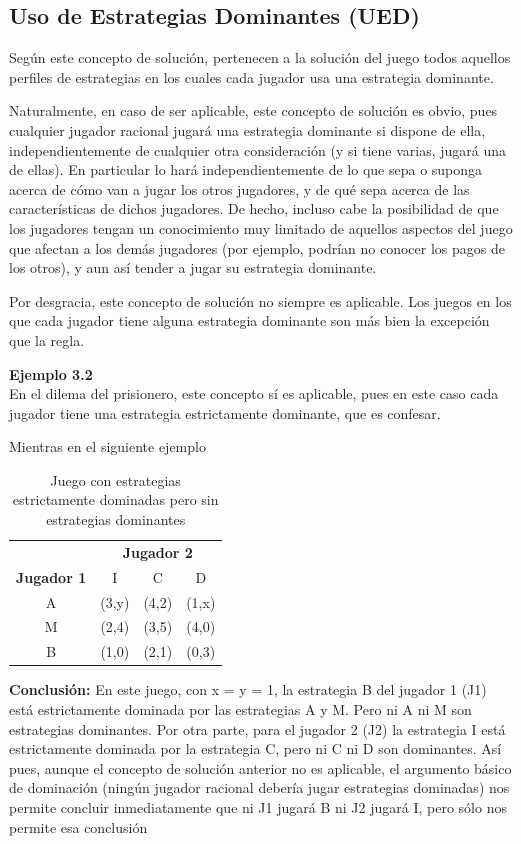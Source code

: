 \documentclass[12pt,a4paper,]{book}
\numberwithin{dummy}{section}
\theoremstyle{ocrenumbox}
\theoremstyle{blacknumex}
\theoremstyle{blacknumbox}
\theoremstyle{ocrenum}
\theoremstyle{ocrenum}
\begin{document}
\subsection{Uso de Estrategias Dominantes
(UED)}\label{uso-de-estrategias-dominantes-ued}

Según este concepto de solución, pertenecen a la solución del juego
todos aquellos perfiles de estrategias en los cuales cada jugador usa
una estrategia dominante.

Naturalmente, en caso de ser aplicable, este concepto de solución es
obvio, pues cualquier jugador racional jugará una estrategia dominante
si dispone de ella, independientemente de cualquier otra consideración
(y si tiene varias, jugará una de ellas). En particular lo hará
independientemente de lo que sepa o suponga acerca de cómo van a jugar
los otros jugadores, y de qué sepa acerca de las características de
dichos jugadores. De hecho, incluso cabe la posibilidad de que los
jugadores tengan un conocimiento muy limitado de aquellos aspectos del
juego que afectan a los demás jugadores (por ejemplo, podrían no conocer
los pagos de los otros), y aun así tender a jugar su estrategia
dominante.

Por desgracia, este concepto de solución no siempre es aplicable. Los
juegos en los que cada jugador tiene alguna estrategia dominante son más
bien la excepción que la regla.

\begin{tcolorbox}[colback=blue!10]
\textbf{Ejemplo 3.2} \\

En el dilema del prisionero, este concepto sí es aplicable, pues en este caso cada jugador tiene una estrategia estrictamente dominante, que es confesar.

Mientras en el siguiente ejemplo  

\begin{table}[H]
\centering
\begin{tabular}{c|ccc}
 & \multicolumn{3}{c}{\textbf{Jugador 2}} \\ 
\textbf{Jugador 1} & I & C & D \\ \hline
A & (3,y) & (4,2) & (1,x) \\
M & (2,4) & (3,5) & (4,0) \\
B & (1,0) & (2,1) & (0,3)
\end{tabular}
\caption{Juego con estrategias estrictamente dominadas pero sin estrategias dominantes}
\label{tab:contraejemplo_UED}
\end{table}

\textbf{Conclusión:}  
En este juego, con x = y = 1, la estrategia B del jugador 1 (J1) está estrictamente dominada por las estrategias A y M. Pero ni A ni M son estrategias dominantes. Por otra parte, para el jugador 2 (J2) la estrategia I está estrictamente dominada por la estrategia C, pero ni C ni D son dominantes. Así pues, aunque el concepto de solución anterior no es aplicable, el argumento básico de dominación (ningún jugador racional debería jugar estrategias dominadas) nos permite concluir inmediatamente que ni J1 jugará B ni J2 jugará I, pero sólo nos permite esa conclusión
\end{tcolorbox}
\end{document}
